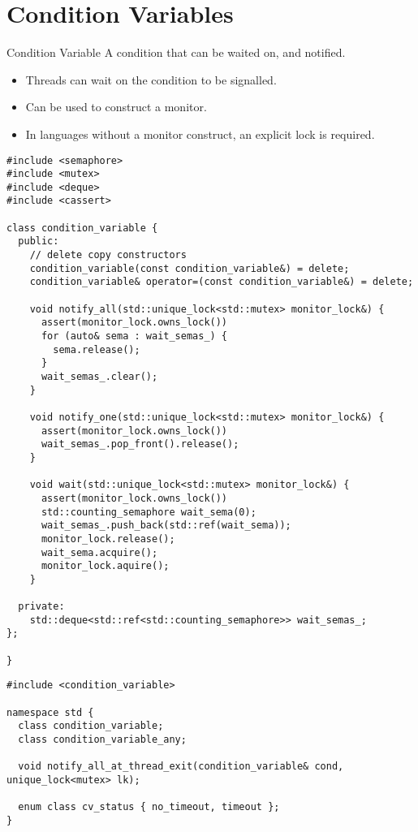 \section{Condition Variables}
\begin{definitionbox}{Condition Variable}
  A condition that can be waited on, and notified.
  \begin{itemize}
    \item Threads can wait on the condition to be signalled.
    \item Can be used to construct a monitor.
    \item In languages without a monitor construct, an explicit lock is required.
  \end{itemize}
  \begin{verbatim}
#include <semaphore>
#include <mutex>
#include <deque>
#include <cassert> 

class condition_variable {
  public:
    // delete copy constructors
    condition_variable(const condition_variable&) = delete;
    condition_variable& operator=(const condition_variable&) = delete;

    void notify_all(std::unique_lock<std::mutex> monitor_lock&) {
      assert(monitor_lock.owns_lock())
      for (auto& sema : wait_semas_) {
        sema.release();
      }
      wait_semas_.clear();
    }

    void notify_one(std::unique_lock<std::mutex> monitor_lock&) {
      assert(monitor_lock.owns_lock())
      wait_semas_.pop_front().release();
    }

    void wait(std::unique_lock<std::mutex> monitor_lock&) {
      assert(monitor_lock.owns_lock())
      std::counting_semaphore wait_sema(0);
      wait_semas_.push_back(std::ref(wait_sema));
      monitor_lock.release();
      wait_sema.acquire();
      monitor_lock.aquire();
    }
  
  private:
    std::deque<std::ref<std::counting_semaphore>> wait_semas_;
};

}
  \end{verbatim}
\end{definitionbox}

\begin{verbatim}
#include <condition_variable>

namespace std {
  class condition_variable;
  class condition_variable_any;
  
  void notify_all_at_thread_exit(condition_variable& cond, unique_lock<mutex> lk);
  
  enum class cv_status { no_timeout, timeout };
}
\end{verbatim}

